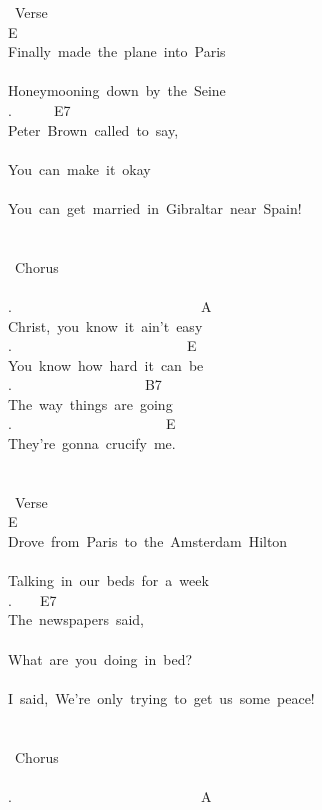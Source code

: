 {\lbrack\ Verse\rbrack\\
E\\
Finally\ made\ the\ plane\ into\ Paris\\
\\
Honeymooning\ down\ by\ the\ Seine\\
.\ \ \ \ \ \ E7\\
Peter\ Brown\ called\ to\ say,\\
\\
\;You\ can\ make\ it\ okay\;\\
\\
\;You\ can\ get\ married\ in\ Gibraltar\ near\ Spain!\;\\
\\
\\
\lbrack\ Chorus\rbrack\\
\\
.\ \ \ \ \ \ \ \ \ \ \ \ \ \ \ \ \ \ \ \ \ \ \ \ \ \ \ A\\
Christ,\ you\ know\ it\ ain't\ easy\\
.\ \ \ \ \ \ \ \ \ \ \ \ \ \ \ \ \ \ \ \ \ \ \ \ \ E\\
You\ know\ how\ hard\ it\ can\ be\\
.\ \ \ \ \ \ \ \ \ \ \ \ \ \ \ \ \ \ \ B7\\
The\ way\ things\ are\ going\\
.\ \ \ \ \ \ \ \ \ \ \ \ \ \ \ \ \ \ \ \ \ \ E\\
They're\ gonna\ crucify\ me.\\
\\
\\
\lbrack\ Verse\rbrack\\
E\\
Drove\ from\ Paris\ to\ the\ Amsterdam\ Hilton\\
\\
Talking\ in\ our\ beds\ for\ a\ week\\
.\ \ \ \ E7\\
The\ newspapers\ said,\\
\\
\;What\ are\ you\ doing\ in\ bed?\;\\
\\
I\ said,\ \;We're\ only\ trying\ to\ get\ us\ some\ peace!\;\\
\\
\\
\lbrack\ Chorus\rbrack\\
\\
.\ \ \ \ \ \ \ \ \ \ \ \ \ \ \ \ \ \ \ \ \ \ \ \ \ \ \ A\\
}
